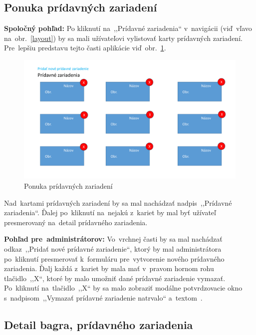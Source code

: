 \subsection{Ponuka prídavných zariadení}
\label{ponuka pridavnych zariadeni}

\textbf{Spoločný pohľad:} Po kliknutí na~,,Prídavné zariadenia`` v~navigácii (viď~vľavo na~obr.~\ref{layout}) by sa mali užívateľovi vylistovať karty prídavných zariadení. Pre~lepšiu predstavu tejto časti aplikácie viď~obr.~\ref{additional equipment cards}.

\begin{figure}[H]\centering
\includegraphics[width=140mm]{../img/UI concept/additional equipment cards}
\caption{Ponuka prídavných zariadení}
\label{additional equipment cards}
\end{figure}

Nad~kartami prídavných zariadení by sa mal nachádzať nadpis~,,Prídavné zariadenia``. Ďalej po~kliknutí na~nejakú z~kariet by mal byť užívateľ presmerovaný na~detail prídavného zariadenia.

\textbf{Pohľad pre~administrátorov:} Vo~vrchnej časti by sa mal nachádzať odkaz~,,Pridať nové prídavné zariadenie``, ktorý by mal administrátora po~kliknutí presmerovať k~formuláru pre~vytvorenie nového prídavného zariadenia. Ďalj každá z~kariet by mala mať v~pravom hornom rohu tlačidlo~,,X``, ktoré by malo umožniť dané prídavné zariadenie vymazať. Po~kliknutí na~tlačidlo~,,X`` by sa malo zobraziť modálne potvrdzovacie okno s~nadpisom~,,Vymazať prídavné zariadenie natrvalo`` a~textom~.

\subsection{Detail bagra, prídavného zariadenia}
\label{detail bagra pridavneho zariadenia}

